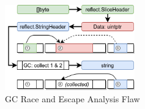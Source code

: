 \begin{figure}[!t]
    \includegraphics[width=0.5\textwidth]{gfx/figures/gcrace-vuln.png}
    \caption{GC Race and Escape Analysis Flaw}
    \label{fig:gcrace-vuln}
\end{figure}
